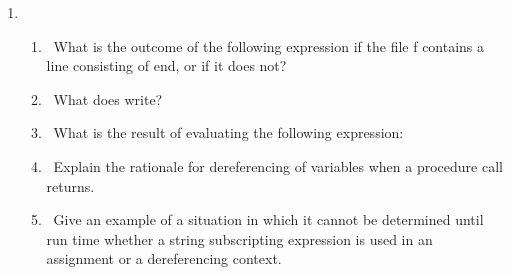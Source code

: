 \liststyleLi
\begin{enumerate}
\item \begin{enumerate}
\item 
\ What is the outcome of the following expression if the file f contains a line consisting of
{\textquotedbl}end{\textquotedbl}, or if it does not?\newline

\item 
\ What does
{}
write?
\item 
\ What is the result of evaluating the following expression:
\item 
\ Explain the rationale for dereferencing of variables when a procedure call returns.
\item 
\ Give an example of a situation in which it cannot be determined until run time whether a string subscripting
expression is used in an assignment or a dereferencing context.
\end{enumerate}
\end{enumerate}
